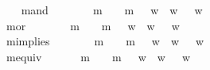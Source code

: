 \begin{isabellebody}
\ \ \isamarkupfalse%
\ mand\ {\isacharcolon}{\isacharcolon}\ {\isachardoublequoteopen}{\isasymsigma}\ {\isasymRightarrow}\ {\isasymsigma}\ {\isasymRightarrow}\ {\isasymsigma}{\isachardoublequoteclose}\ {\isacharparenleft}\ {\isachardoublequoteopen}m{\isasymand}{\isachardoublequoteclose}\ {}{}{\isacharparenright}\ \ {\isachardoublequoteopen}{\isasymphi}\ m{\isasymand}\ {\isasympsi}\ {\isasymequiv}\ {\isacharparenleft}{\isasymlambda}w{\isachardot}\ {\isasymphi}\ w\ {\isasymand}\ {\isasympsi}\ w{\isacharparenright}{\isachardoublequoteclose}\ \ \ \isanewline
\ \ \isamarkupfalse%
\ mor\ {\isacharcolon}{\isacharcolon}\ {\isachardoublequoteopen}{\isasymsigma}\ {\isasymRightarrow}\ {\isasymsigma}\ {\isasymRightarrow}\ {\isasymsigma}{\isachardoublequoteclose}\ {\isacharparenleft}\ {\isachardoublequoteopen}m{\isasymor}{\isachardoublequoteclose}\ {}{}{\isacharparenright}\ \ {\isachardoublequoteopen}{\isasymphi}\ m{\isasymor}\ {\isasympsi}\ {\isasymequiv}\ {\isacharparenleft}{\isasymlambda}w{\isachardot}\ {\isasymphi}\ w\ {\isasymor}\ {\isasympsi}\ w{\isacharparenright}{\isachardoublequoteclose}\ \ \ \isanewline
\ \ \isamarkupfalse%
\ mimplies\ {\isacharcolon}{\isacharcolon}\ {\isachardoublequoteopen}{\isasymsigma}\ {\isasymRightarrow}\ {\isasymsigma}\ {\isasymRightarrow}\ {\isasymsigma}{\isachardoublequoteclose}\ {\isacharparenleft}\ {\isachardoublequoteopen}m{\isasymrightarrow}{\isachardoublequoteclose}\ {}{}{\isacharparenright}\ \ {\isachardoublequoteopen}{\isasymphi}\ m{\isasymrightarrow}\ {\isasympsi}\ {\isasymequiv}\ {\isacharparenleft}{\isasymlambda}w{\isachardot}\ {\isasymphi}\ w\ {\isasymlongrightarrow}\ {\isasympsi}\ w{\isacharparenright}{\isachardoublequoteclose}\ \ \isanewline
\ \ \isamarkupfalse%
\ mequiv{\isacharcolon}{\isacharcolon}\ {\isachardoublequoteopen}{\isasymsigma}\ {\isasymRightarrow}\ {\isasymsigma}\ {\isasymRightarrow}\ {\isasymsigma}{\isachardoublequoteclose}\ {\isacharparenleft}\ {\isachardoublequoteopen}m{\isasymequiv}{\isachardoublequoteclose}\ {}{}{\isacharparenright}\ \ {\isachardoublequoteopen}{\isasymphi}\ m{\isasymequiv}\ {\isasympsi}\ {\isasymequiv}\ {\isacharparenleft}{\isasymlambda}w{\isachardot}\ {\isacharparenleft}{\isasymphi}\ w\ {\isasymlongleftrightarrow}\ {\isasympsi}\ w{\isacharparenright}{\isacharparenright}{\isachardoublequoteclose}\ \ \isanewline

\end{isabellebody}
